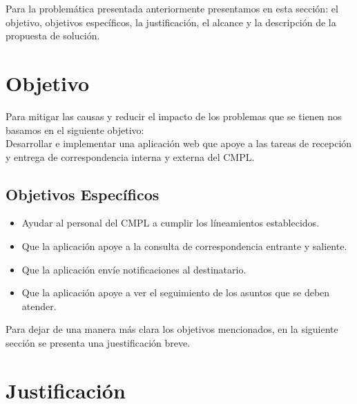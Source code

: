 Para la problemática presentada anteriormente presentamos en esta sección: el objetivo, objetivos específicos, la justificación, el alcance y la descripción de la propuesta de solución. \\

\section{Objetivo}

Para mitigar las causas y reducir el impacto de los problemas que se tienen nos basamos en el siguiente objetivo: \\

Desarrollar e implementar una aplicación web que apoye a las tareas de recepción y entrega de correspondencia interna y externa del CMPL. \\

\subsection{Objetivos Específicos}

\begin{itemize}
	\item Ayudar al personal del CMPL a cumplir los líneamientos establecidos. %
	\item Que la aplicación apoye a la consulta de correspondencia entrante y saliente.
	\item Que la aplicación envíe notificaciones al destinatario.
	\item Que la aplicación apoye a ver el seguimiento de los asuntos que se deben atender.
\end{itemize}

Para dejar de una manera más clara los objetivos mencionados, en la siguiente sección se presenta una juestificación breve.

\section{Justificación}

